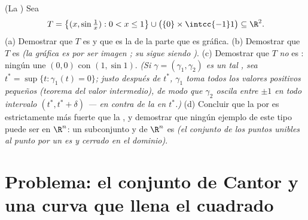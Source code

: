 \begin{exercise}[$\star\star\star$]\label{exo:b3:topology:12}
(La ) Sea
\[
T = \bigl\{(x, \sin\tfrac1x) : 0 < x \leq 1\bigr\}
\cup \bigl(\{0\}\times\intcc{-1}1\bigr) \subseteq \R^2 .
\]
(a) Demostrar que $T$ es  y
que es la  de la parte que es
gráfica. (b) Demostrar que $T$ es
 \emph{(la gráfica es
 por ser imagen
; su
 sigue siendo
)}. (c) Demostrar que $T$
\emph{no} es :
ningún 
 une $(0,0)$ con
$(1, \sin1)$. \emph{(Si $\gamma =
(\gamma_1, \gamma_2)$ es un tal
, sea $t^* = \sup\{t :
\gamma_1(t) = 0\}$; justo después de $t^*$, $\gamma_1$ toma todos los
valores positivos pequeños (teorema del valor intermedio), de modo que
$\gamma_2$ oscila entre $\pm1$ en todo intervalo $(t^*, t^* + \delta)$
--- en contra de la  en
$t^*$.)} (d) Concluir que la 
por  es estrictamente más fuerte que la
, y demostrar que ningún
ejemplo de este tipo puede ser  en $\R^n$: un subconjunto
\emph{} y  de $\R^n$ es
 \emph{(el
conjunto de los puntos unibles al punto  por un
 es  y cerrado en
el dominio)}.
\end{exercise}

\section{Problema: el conjunto de Cantor y una curva que llena el
cuadrado}

